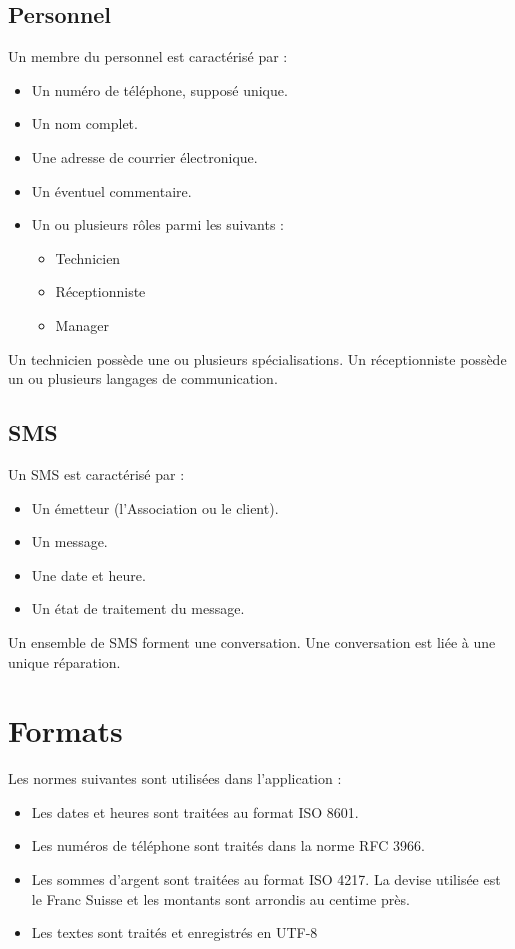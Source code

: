 \documentclass{article}
\begin{document}
\subsection*{Personnel}
Un membre du personnel est caractérisé par :
\begin{itemize}
    \item Un numéro de téléphone, supposé unique.
    \item Un nom complet.
    \item Une adresse de courrier électronique.
    \item Un éventuel commentaire.
    \item Un ou plusieurs rôles parmi les suivants :
    \begin{itemize}
        \item Technicien
        \item Réceptionniste
        \item Manager
    \end{itemize}
\end{itemize}

Un technicien possède une ou plusieurs spécialisations. Un réceptionniste possède un ou plusieurs langages de communication.

\subsection*{SMS}
Un SMS est caractérisé par :
\begin{itemize}
    \item Un émetteur (l'Association ou le client).
    \item Un message.
    \item Une date et heure.
    \item Un état de traitement du message.
\end{itemize}

Un ensemble de SMS forment une conversation. Une conversation est liée à une unique réparation.

\section{Formats}
Les normes suivantes sont utilisées dans l'application :
\begin{itemize}
    \item Les dates et heures sont traitées au format ISO 8601.
    \item Les numéros de téléphone sont traités dans la norme RFC 3966.
    \item Les sommes d'argent sont traitées au format ISO 4217. La devise utilisée est le Franc Suisse et les montants sont arrondis au centime près.
    \item Les textes sont traités et enregistrés en UTF-8
\end{itemize}
\end{document}
